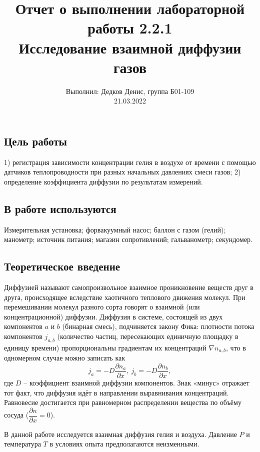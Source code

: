 \documentclass[12pt,a4paper]{article}
\author{\normalsize Выполнил: Дедков Денис, группа Б01-109 \\
	\normalsize 21.03.2022}
\date{}
\title
{
	\large Отчет о выполнении лабораторной работы 2.2.1 \\
	\Large Исследование взаимной диффузии газов \\ 
}
\begin{document}
	\maketitle
	
	\subsection*{Цель работы} 1) регистрация зависимости концентрации гелия в воздухе от времени с помощью датчиков теплопроводности при разных начальных давлениях смеси газов; 2) определение коэффициента диффузии по результатам измерений.
	
	\subsection*{В работе используются}
	Измерительная установка; форвакуумный насос; баллон с газом (гелий); манометр; источник питания;
	магазин сопротивлений; гальванометр; секундомер.
	
	\subsection*{Теоретическое введение}
Диффузией называют самопроизвольное взаимное проникновение веществ друг в друга, происходящее вследствие хаотичного теплового движения молекул. При перемешивании молекул разного сорта говорят о взаимной (или концентрационной) диффузии. Диффузия в системе, состоящей из двух компонентов $a$ и $b$ (бинарная смесь), подчиняется закону Фика: плотности потока компонентов $j_{a, b}$ (количество частиц, пересекающих единичную площадку в единицу времени) пропорциональны градиентам их концентраций $\nabla n_{a, b}$, что в одномерном случае можно записать как 
\begin{equation}
	j_a = -D \dfrac{\partial n_a}{\partial x},~j_b = -D \dfrac{\partial n_b}{\partial x},
\end{equation}
где $D$ -- коэффициент взаимной диффузии компонентов. Знак «минус» отражает тот факт, что диффузия идёт в направлении выравнивания концентраций. Равновесие достигается при равномерном распределении вещества по объёму сосуда ($\dfrac{\partial n}{\partial x} = 0$).

В данной работе исследуется взаимная диффузия гелия и воздуха. Давление $P$ и температура $T$ в условиях опыта предполагаются неизменными.
\end{document}
